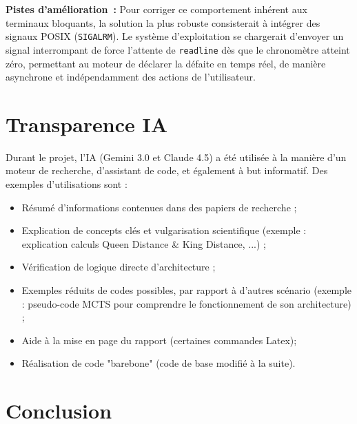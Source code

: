 \documentclass[a4paper]{article}
\begin{document}
\textbf{Pistes d'amélioration~:} Pour corriger ce comportement inhérent aux terminaux bloquants, la solution la plus robuste consisterait à intégrer des signaux POSIX (\texttt{SIGALRM}). Le système d'exploitation se chargerait d'envoyer un signal interrompant de force l'attente de \texttt{readline} dès que le chronomètre atteint zéro, permettant au moteur de déclarer la défaite en temps réel, de manière asynchrone et indépendamment des actions de l'utilisateur.

\section{Transparence IA}

Durant le projet, l'IA (Gemini 3.0 et Claude 4.5) a été utilisée à la manière d'un moteur de recherche, d'assistant de code, et également à but informatif. Des exemples d'utilisations sont :
\begin{itemize}
    \item Résumé d'informations contenues dans des papiers de recherche ;
    \item Explication de concepts clés et vulgarisation scientifique (exemple : explication calculs Queen Distance \& King Distance, ...) ;
    \item Vérification de logique directe d'architecture ;
    \item Exemples réduits de codes possibles, par rapport à d'autres scénario (exemple : pseudo-code MCTS pour comprendre le fonctionnement de son architecture) ;
    \item Aide à la mise en page du rapport (certaines commandes Latex);
    \item Réalisation de code "barebone" (code de base modifié à la suite).
\end{itemize}



\section*{Conclusion}
\end{document}
